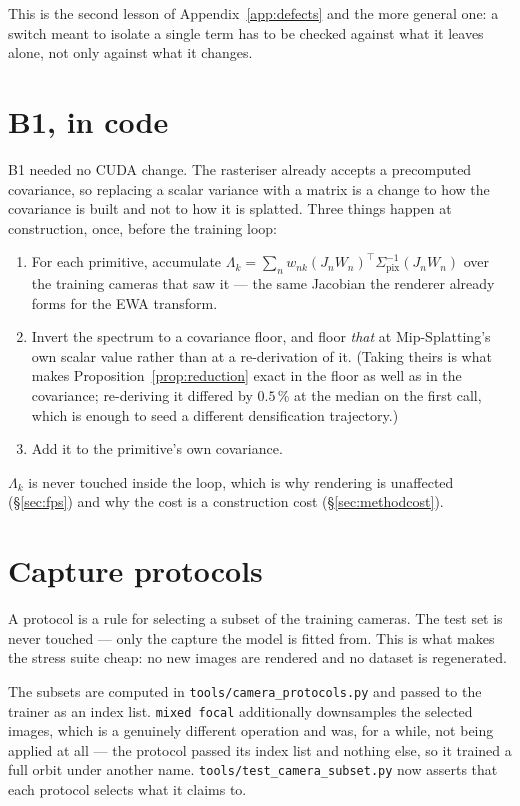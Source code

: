 This is the second lesson of Appendix~\ref{app:defects} and the more general one:
a switch meant to isolate a single term has to be checked against what it leaves
alone, not only against what it changes.

\section{B1, in code}

B1 needed no CUDA change. The rasteriser already accepts a precomputed
covariance, so replacing a scalar variance with a matrix is a change to how the
covariance is built and not to how it is splatted. Three things happen at
construction, once, before the training loop:

\begin{enumerate}[leftmargin=1.4em,itemsep=2pt]
  \item For each primitive, accumulate
        $\Lambda_k = \sum_n w_{nk}(J_nW_n)^{\!\top}\Sigma_{\mathrm{pix}}^{-1}(J_nW_n)$
        over the training cameras that saw it --- the same Jacobian the renderer
        already forms for the EWA transform.
  \item Invert the spectrum to a covariance floor, and floor \emph{that} at
        Mip-Splatting's own scalar value rather than at a re-derivation of it.
        (Taking theirs is what makes Proposition~\ref{prop:reduction} exact in the
        floor as well as in the covariance; re-deriving it differed by $0.5\,\%$
        at the median on the first call, which is enough to seed a different
        densification trajectory.)
  \item Add it to the primitive's own covariance.
\end{enumerate}

$\Lambda_k$ is never touched inside the loop, which is why rendering is
unaffected (\S\ref{sec:fps}) and why the cost is a construction cost
(\S\ref{sec:methodcost}).

\section{Capture protocols}

A protocol is a rule for selecting a subset of the training cameras. The test set
is never touched --- only the capture the model is fitted from. This is what makes
the stress suite cheap: no new images are rendered and no dataset is regenerated.

The subsets are computed in \texttt{tools/camera\_protocols.py} and passed to the
trainer as an index list. \texttt{mixed focal} additionally downsamples the
selected images, which is a genuinely different operation and was, for a while,
not being applied at all --- the protocol passed its index list and nothing else,
so it trained a full orbit under another name. \texttt{tools/test\_camera\_subset.py}
now asserts that each protocol selects what it claims to.

